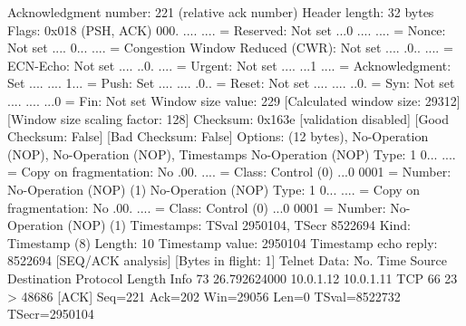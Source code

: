     Acknowledgment number: 221    (relative ack number)
    Header length: 32 bytes
    Flags: 0x018 (PSH, ACK)
        000. .... .... = Reserved: Not set
        ...0 .... .... = Nonce: Not set
        .... 0... .... = Congestion Window Reduced (CWR): Not set
        .... .0.. .... = ECN-Echo: Not set
        .... ..0. .... = Urgent: Not set
        .... ...1 .... = Acknowledgment: Set
        .... .... 1... = Push: Set
        .... .... .0.. = Reset: Not set
        .... .... ..0. = Syn: Not set
        .... .... ...0 = Fin: Not set
    Window size value: 229
    [Calculated window size: 29312]
    [Window size scaling factor: 128]
    Checksum: 0x163e [validation disabled]
        [Good Checksum: False]
        [Bad Checksum: False]
    Options: (12 bytes), No-Operation (NOP), No-Operation (NOP), Timestamps
        No-Operation (NOP)
            Type: 1
                0... .... = Copy on fragmentation: No
                .00. .... = Class: Control (0)
                ...0 0001 = Number: No-Operation (NOP) (1)
        No-Operation (NOP)
            Type: 1
                0... .... = Copy on fragmentation: No
                .00. .... = Class: Control (0)
                ...0 0001 = Number: No-Operation (NOP) (1)
        Timestamps: TSval 2950104, TSecr 8522694
            Kind: Timestamp (8)
            Length: 10
            Timestamp value: 2950104
            Timestamp echo reply: 8522694
    [SEQ/ACK analysis]
        [Bytes in flight: 1]
Telnet
    Data: \r

No.     Time           Source                Destination           Protocol Length Info
     73 26.792624000   10.0.1.12             10.0.1.11             TCP      66     23 > 48686 [ACK] Seq=221 Ack=202 Win=29056 Len=0 TSval=8522732 TSecr=2950104

